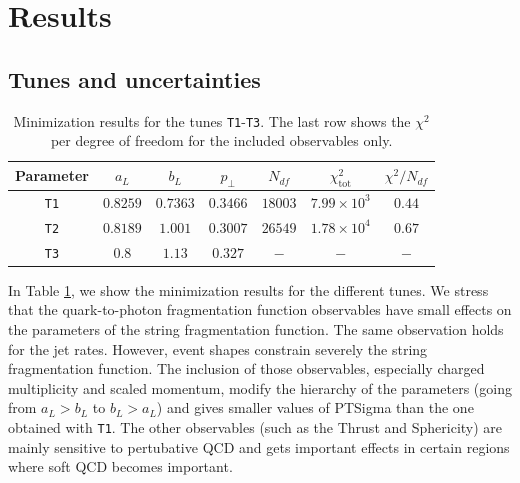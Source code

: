 \documentclass[aps,preprint,floatfix,nofootinbib,showpacs]{revtex4-1}
\begin{document}
\section{Results}
\label{Section4}

\subsection{Tunes and uncertainties}

\begin{table}[!h]
 \begin{center}
  \begin{tabular}{ c | c | c | c | c | c | c }
  \hline \hline
   Parameter   & \hspace{0.8cm} $a_L$  \hspace{0.8cm} & \hspace{0.8cm} $b_L$  \hspace{0.8cm} & \hspace{0.8cm} $p_\perp$ \hspace{0.8cm}  & \hspace{0.8cm} $N_{df}$ & $\chi^2_\textrm{tot}$ & $\chi^2/N_{df}$ \hspace{0.8cm} \\ \hline
   \texttt{T1} & $0.8259$      & $0.7363$  & $0.3466$  & $18003$ & $7.99 \times 10^3$ & $0.44$          \\ \hline
   \texttt{T2} & $0.8189$      & $1.001$  & $0.3007$  &  $26549$ & $1.78 \times 10^4$  &  $0.67$     \\ \hline
   \texttt{T3} & $0.8$         & $1.13$    & $0.327$   & $-$ & $-$  & $-$          \\ \hline \hline
  \end{tabular}
 \end{center}
 \caption{Minimization results for the tunes \texttt{T1}-\texttt{T3}. 
 The last row shows the $\chi^2$ per degree of freedom for the included observables only.}
 \label{Table.tunes}
\end{table}

In Table \ref{Table.tunes}, we show 
the minimization results for the different tunes. We stress
that the quark-to-photon fragmentation
function observables have small effects on the parameters of the string 
fragmentation function. The same observation holds for the jet rates. 
However, event shapes constrain severely the string fragmentation function. 
The inclusion of those  observables, especially charged multiplicity 
and scaled momentum, modify the hierarchy of the parameters 
(going from $a_L > b_L$ to $b_L > a_L$) and gives smaller 
values of \textsf{PTSigma} than the one obtained with 
\texttt{T1}. The other observables (such
as the Thrust and Sphericity) are mainly sensitive 
to pertubative QCD and gets important effects in certain
regions where soft QCD becomes important. 
\end{document}
